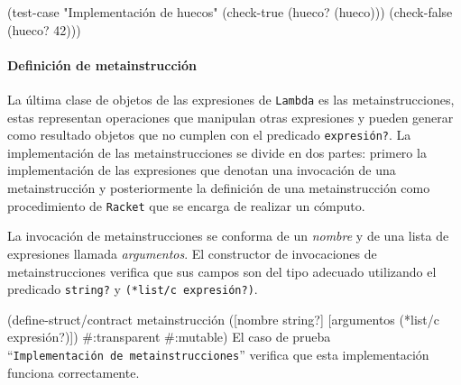 \documentclass[10pt,oneside,openany,letterpaper]{book}
\begin{document}
\nwenddocs{}\plusendmoddef
(test-case "Implementación de huecos"
  (check-true (hueco? (hueco)))
  (check-false (hueco? 42)))
\nwendcode{}\nwdocspar

\paragraph{Definición de metainstrucción} La última clase de objetos de las expresiones de {\tt{}Lambda} es las metainstrucciones, estas representan operaciones que manipulan otras expresiones y pueden generar como resultado objetos que no cumplen con el predicado {\tt{}\protect{}expresión?}. La implementación de las metainstrucciones se divide en dos partes: primero la implementación de las expresiones que denotan una invocación de una metainstrucción y posteriormente la definición de una metainstrucción como procedimiento de {\tt{}Racket} que se encarga de realizar un cómputo.

La invocación de metainstrucciones se conforma de un \emph{nombre} y de una lista de expresiones llamada \emph{argumentos}. El constructor de invocaciones de metainstrucciones verifica que sus campos son del tipo adecuado utilizando el predicado {\tt{}string?} y {\tt{}(*list/c\ \protect{}expresión?)}.

\nwenddocs{}\endmoddef
(define-struct/contract metainstrucción
  ([nombre string?] [argumentos (*list/c expresión?)])
  #:transparent
  #:mutable)
\eatline
{}\nwendcode{}\nwdocspar
El caso de prueba ``{\tt{}Implementación\ de\ \protect{}metainstrucciones}'' verifica que esta implementación funciona correctamente.
\end{document}
